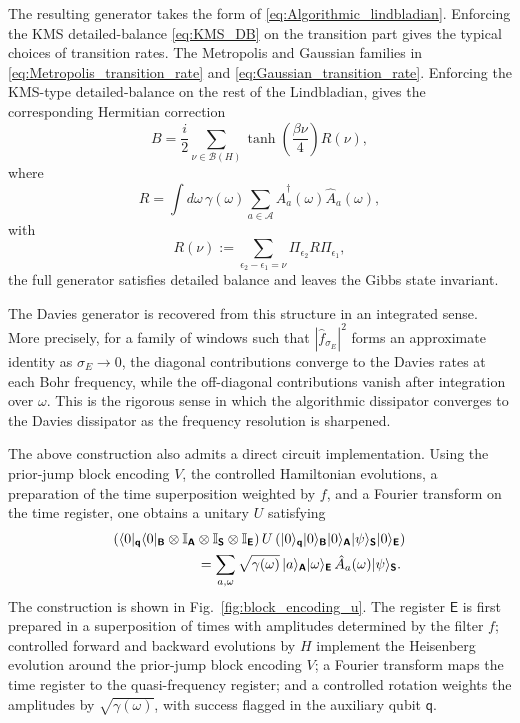 \documentclass[showpacs,amsmath,amssymb,twocolumn,prx,superscriptaddress,10pt,aps,nofootinbib]{revtex4-2}
\DeclarePairedDelimiter\bra{\langle}{|}
\DeclarePairedDelimiter\ket{|}{\rangle}
\newcommand{\bbI}{\mathbb{I}}
\newcommand{\rS}{\boldsymbol{\mathsf{S}}}
\newcommand{\rE}{\boldsymbol{\mathsf{E}}}
\newcommand{\rA}{\boldsymbol{\mathsf{A}}}
\newcommand{\rB}{\boldsymbol{\mathsf{B}}}
\newcommand{\rqq}{\boldsymbol{\mathsf{q}}}
\begin{document}
The resulting generator takes the form of \eqref{eq:Algorithmic_lindbladian}. Enforcing the KMS detailed-balance \eqref{eq:KMS_DB} on the transition part gives the typical choices of transition rates. The Metropolis and Gaussian families in \eqref{eq:Metropolis_transition_rate} and \eqref{eq:Gaussian_transition_rate}. Enforcing the KMS-type detailed-balance on the rest of the Lindbladian, gives the corresponding Hermitian correction
\begin{equation}
    B=\frac{i}{2}\sum_{\nu\in\mathcal{B}(H)}
    \tanh\!\left(\frac{\beta\nu}{4}\right)R(\nu),
\end{equation}
where
\begin{equation}
    R=
    \int d\omega\, \gamma(\omega)\sum_{a\in\mathcal{A}}
    \hat A_a^\dagger(\omega)\hat A_a(\omega),
\end{equation}
with
\begin{equation}
    R(\nu):=\sum_{\epsilon_2-\epsilon_1=\nu}\Pi_{\epsilon_2}R\Pi_{\epsilon_1},
\end{equation}
the full generator satisfies detailed balance and leaves the Gibbs state invariant.

The Davies generator is recovered from this structure in an integrated sense. More precisely, for a family of windows such that $|\hat f_{\sigma_E}|^2$ forms an approximate identity as $\sigma_E\to0$, the diagonal contributions converge to the Davies rates at each Bohr frequency, while the off-diagonal contributions vanish after integration over $\omega$. This is the rigorous sense in which the algorithmic dissipator converges to the Davies dissipator as the frequency resolution is sharpened.

The above construction also admits a direct circuit implementation. Using the prior-jump block encoding $V$, the controlled Hamiltonian evolutions, a preparation of the time superposition weighted by $f$, and a Fourier transform on the time register, one obtains a unitary $U$ satisfying
\begin{align}
\label{eq:appendix_filtered_jump_block_encoding}
    &(\bra{0}_{\rqq}\bra{0}_{\rB}\otimes \bbI_{\rA}\otimes \bbI_{\rS}\otimes \bbI_{\rE})
    \,U\,
    (\ket{0}_{\rqq}\ket{0}_{\rB}\ket{0}_{\rA}\ket{\psi}_{\rS}\ket{0}_{\rE})
    \nonumber\\
    &\hspace{6em}=
    \sum_{a,\omega}
    \sqrt{\gamma(\omega)}\,
    \ket{a}_{\rA}\ket{\omega}_{\rE}\,
    \hat A_a(\omega)\ket{\psi}_{\rS}.
\end{align}
The construction is shown in Fig.~\ref{fig:block_encoding_u}. The register $\rE$ is first prepared in a superposition of times with amplitudes determined by the filter $f$; controlled forward and backward evolutions by $H$ implement the Heisenberg evolution around the prior-jump block encoding $V$; a Fourier transform maps the time register to the quasi-frequency register; and a controlled rotation weights the amplitudes by $\sqrt{\gamma(\omega)}$, with success flagged in the auxiliary qubit $\rqq$.
\end{document}
